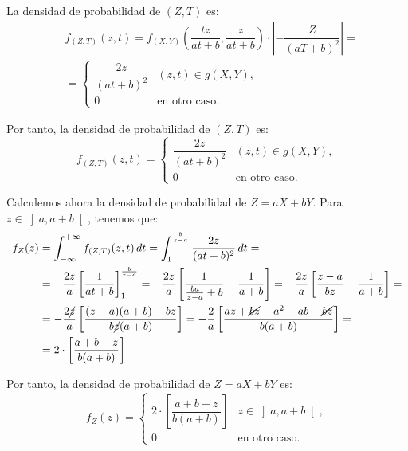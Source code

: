 \begin{ejercicio}
\begin{figure}[H]
    \end{figure}    

    La densidad de probabilidad de $(Z,T)$ es:
    \begin{align*}
        &f_{(Z,T)}(z, t) = f_{(X,Y)}\left(\dfrac{tz}{at+b},\dfrac{z}{at+b}\right)\cdot \left|- \dfrac{Z}{(aT+b)^2}\right|
        =\\&= \begin{cases}
            \dfrac{2z}{(at+b)^2} & (z,t)\in g(X,Y), \\
            0 & \text{en otro caso}.
        \end{cases}
    \end{align*}

    Por tanto, la densidad de probabilidad de $(Z,T)$ es:
    \begin{equation*}
        f_{(Z,T)}(z, t) = \begin{cases}
            \dfrac{2z}{(at+b)^2} & (z,t)\in g(X,Y), \\
            0 & \text{en otro caso}.
        \end{cases}
    \end{equation*}

    Calculemos ahora la densidad de probabilidad de $Z=aX+bY$. Para $z\in\left]a,a+b\right[$, tenemos que:
    \begin{align*}
        f_Z(z)&=\int_{-\infty}^{+\infty} f_{(Z,T)}(z, t) \, dt
        = \int_{1}^{\frac{b}{z-a}} \dfrac{2z}{(at+b)^2} \, dt
        =\\&= -\frac{2z}{a}\left[\dfrac{1}{at+b}\right]_{1}^{\frac{b}{z-a}}
        = -\frac{2z}{a}\left[\dfrac{1}{\frac{ba}{z-a}+b}-\dfrac{1}{a+b}\right]
        = -\frac{2z}{a}\left[\dfrac{z-a}{bz}-\dfrac{1}{a+b}\right]
        =\\&= -\frac{2\cancel{z}}{a}\left[\dfrac{(z-a)(a+b)-bz}{b\cancel{z}(a+b)}\right]
        = -\frac{2}{a}\left[\dfrac{az+\cancel{bz}-a^2-ab-\cancel{bz}}{b(a+b)}\right]
        =\\&= 2\cdot \left[\dfrac{a+b-z}{b(a+b)}\right]
    \end{align*}

    Por tanto, la densidad de probabilidad de $Z=aX+bY$ es:
    \begin{equation*}
        f_Z(z) = \begin{cases}
            2\cdot \left[\dfrac{a+b-z}{b(a+b)}\right] & z\in\left]a,a+b\right[, \\
            0 & \text{en otro caso}.
        \end{cases}
    \end{equation*}


\end{ejercicio}

